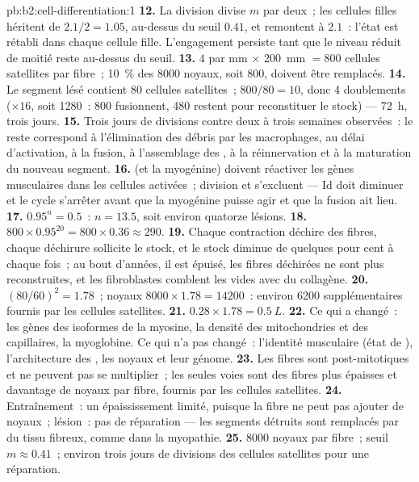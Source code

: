 \begin{solution}{pb:b2:cell-differentiation:1}
\textbf{12.} La division divise $m$ par deux~; les cellules filles
héritent de $2.1/2 =
1.05$, au-dessus du seuil $0.41$, et remontent à $2.1$~: l'état est
rétabli dans chaque cellule fille. L'engagement persiste tant que le
niveau réduit de moitié reste au-dessus du seuil.
\textbf{13.} $4$ par mm $\times$ \qty{200}{mm} $= 800$ cellules
satellites par fibre~; \qty{10}{\%} des \num{8000} noyaux, soit
\num{800}, doivent être remplacés.
\textbf{14.} Le segment lésé contient $80$ cellules satellites~;
$800/80 =
10$, donc 4 doublements ($\times 16$, soit \num{1280}~: 800 fusionnent,
480 restent pour reconstituer le stock) --- \qty{72}{h}, trois jours.
\textbf{15.} Trois jours de divisions contre deux à trois semaines
observées~: le reste correspond à l'élimination des débris par les
macrophages, au délai d'activation, à la fusion, à l'assemblage des
, à la réinnervation et à la maturation du nouveau segment.
\textbf{16.}  (et la myogénine) doivent réactiver les gènes
musculaires dans les cellules activées~; division et 
s'excluent --- Id doit diminuer et le cycle s'arrêter avant que la
myogénine puisse agir et que la fusion ait lieu.
\textbf{17.} $0.95^{n} = 0.5$~: $n = 13.5$, soit environ quatorze
lésions.
\textbf{18.} $800\times 0.95^{20} = 800\times 0.36 \approx 290$.
\textbf{19.} Chaque contraction déchire des fibres, chaque déchirure
sollicite le stock, et le stock diminue de quelques pour cent à chaque
fois~; au bout d'années, il est épuisé, les fibres déchirées ne sont
plus reconstruites, et les fibroblastes comblent les vides avec du
collagène.
\textbf{20.} $(80/60)^{2} = 1.78$~; noyaux $8000\times 1.78 = \num{14200}$~:
environ \num{6200} supplémentaires fournis par les cellules satellites.
\textbf{21.} $0.28\times 1.78 = \qty{0.5}{L}$.
\textbf{22.} Ce qui a changé~: les gènes des isoformes de la myosine, la
densité des mitochondries et des capillaires, la myoglobine. Ce qui n'a
pas changé~: l'identité musculaire (état de ), l'architecture des
, les noyaux et leur génome.
\textbf{23.} Les fibres sont post-mitotiques et ne peuvent pas se
multiplier~; les seules voies sont des fibres plus épaisses et davantage
de noyaux par fibre, fournis par les cellules satellites.
\textbf{24.} Entraînement~: un épaississement limité, puisque la fibre
ne peut pas ajouter de noyaux~; lésion~: pas de réparation --- les
segments détruits sont remplacés par du tissu fibreux, comme dans la
myopathie.
\textbf{25.} \num{8000} noyaux par fibre~; seuil $m \approx 0.41$~;
environ trois jours de divisions des cellules satellites pour une
réparation.
\end{solution}

